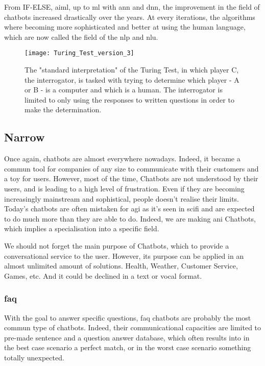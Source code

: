 From IF-ELSE, \gls{aiml}, up to \gls{ml} with \gls{ann} and \gls{dnn}, the improvement in the field of chatbots increased drastically over the years. At every iterations, the algorithms where becoming more sophisticated and better at using the human language, which are now called the field of the \gls{nlp} and \gls{nlu}.

\begin{figure}[h]
    \centering
    \texttt{[image: Turing\_Test\_version\_3]}
    \caption{
       The "standard interpretation" of the Turing Test, in which player C, the interrogator, is tasked with trying to determine which player - A or B - is a computer and which is a human. The interrogator is limited to only using the responses to written questions in order to make the determination. \cite{wikipedia:turing_test_img}
    }
    \label{fig:wikipedia_turing_test_img}
\end{figure}



\subsection{Narrow}
Once again, chatbots are almost everywhere nowadays. Indeed, it became a commun tool for companies of any size to communicate with their customers and a toy for users. However, most of the time, Chatbots are not understood by their users, and is leading to a high level of frustration. Even if they are becoming increasingly mainstream and sophistical, people doesn't realise their limits. Today's chatbots are often mistaken for \gls{agi} as it's seen in \gls{scifi} and are expected to do much more than they are able to do. Indeed, we are making \gls{ani} Chatbots, which implies a specialisation into a specific field.

We should not forget the main purpose of Chatbots, which to provide a conversational service to the user. However, its purpose can be applied in an almost unlimited amount of solutions. Health, Weather, Customer Service, Games, etc. And it could be declined in a text or vocal format.


\subsubsection{\gls{faq}}
With the goal to answer specific questions, \gls{faq} chatbots are probably the most commun type of chatbots. Indeed, their communicational capacities are limited to pre-made sentence and a question answer database, which often results into in the best case scenario a perfect match, or in the worst case scenario something totally unexpected.



